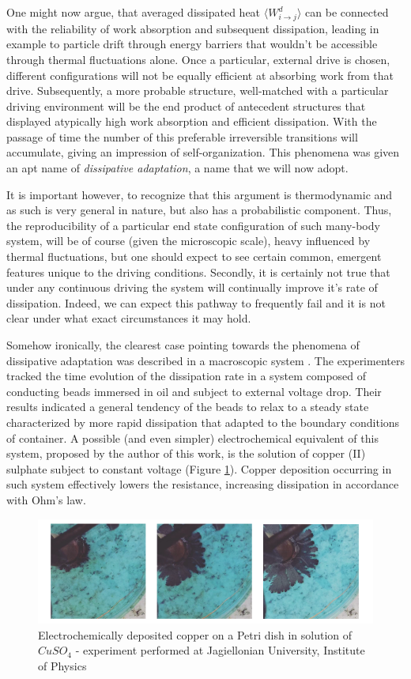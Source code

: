 \documentclass[a4paper,12pt]{article}
\begin{document}
One might now argue, that averaged dissipated heat $\langle W^d_{i \to j} \rangle $ can be connected with the reliability of work absorption and subsequent dissipation, leading in example to particle drift through energy barriers that wouldn't be accessible through thermal fluctuations alone.
Once a particular, external drive is chosen, different configurations will not be equally efficient at absorbing work from that drive. Subsequently, a more probable structure, well-matched with a particular driving environment will be the end product of antecedent structures that displayed atypically high work absorption and efficient dissipation.
With the passage of time the number of this preferable irreversible transitions will accumulate, giving an impression of self-organization.
This phenomena was given an apt name of \textit{dissipative adaptation}, a name that we will now adopt.

It is important however, to recognize that this argument is thermodynamic and as such is very general in nature, but also has a probabilistic component.
Thus, the reproducibility of a particular end state configuration of such many-body system, will be of course (given the microscopic scale), heavy influenced by thermal fluctuations, but one should expect to see certain common, emergent features unique to the driving conditions.
Secondly, it is certainly not true that under any continuous driving the system will continually improve it's rate of dissipation. Indeed, we can expect this pathway to frequently fail and it is not clear under what exact circumstances it may hold.

Somehow ironically, the clearest case pointing towards the phenomena of dissipative adaptation was described in a macroscopic system \cite{Kondepudi:2015bg}. The experimenters tracked the time evolution of the dissipation rate in a system composed of conducting beads immersed in oil and subject to external voltage drop. Their results indicated a general tendency of the beads to relax to a steady state characterized by more rapid dissipation that adapted to the boundary conditions of container.
A possible (and even simpler) electrochemical equivalent of this system, proposed by the author of this work, is the solution of copper (II) sulphate subject to constant voltage (Figure \ref{Fig6}). Copper deposition occurring in such system effectively lowers the resistance, increasing dissipation in accordance with Ohm's law.

\begin{figure}[ht!]
\centering \includegraphics[width=14cm]{Figure6} \caption{Electrochemically deposited copper on a Petri dish in solution of $CuSO_4$ - experiment performed at Jagiellonian University, Institute of Physics}
\label{Fig6} 
\end{figure}
\end{document}

